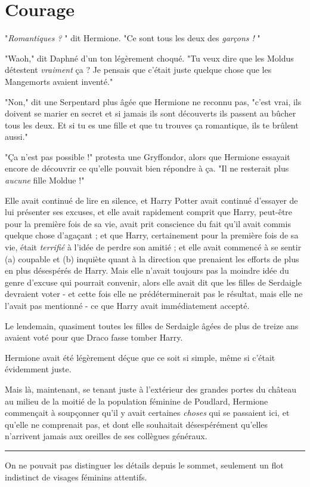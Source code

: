 
\chapter{Courage}

"\emph{Romantiques ?} " dit Hermione. "Ce sont tous les deux des \emph{garçons !} "

"Waoh," dit Daphné d'un ton légèrement choqué. "Tu veux dire que les Moldus détestent \emph{vraiment}  ça ? Je pensais que c'était juste quelque chose que les Mangemorts avaient inventé."

"Non," dit une Serpentard plus âgée que Hermione ne reconnu pas, "c'est vrai, ils doivent se marier en secret et si jamais ils sont découverts ils passent au bûcher tous les deux. Et si tu es une fille et que tu trouves ça romantique, ils te brûlent aussi."

"Ça n'est pas possible !" protesta une Gryffondor, alors que Hermione essayait encore de découvrir ce qu'elle pouvait bien répondre à ça. "Il ne resterait plus \emph{aucune}  fille Moldue !"

Elle avait continué de lire en silence, et Harry Potter avait continué d'essayer de lui présenter ses excuses, et elle avait rapidement comprit que Harry, peut-être pour la première fois de sa vie, avait prit conscience du fait qu'il avait commis quelque chose d'agaçant ; et que Harry, certainement pour la première fois de sa vie, était \emph{terrifié}  à l'idée de perdre son amitié ; et elle avait commencé à se sentir (a) coupable et (b) inquiète quant à la direction que prenaient les efforts de plus en plus désespérés de Harry. Mais elle n'avait toujours pas la moindre idée du genre d'excuse qui pourrait convenir, alors elle avait dit que les filles de Serdaigle devraient voter - et cette fois elle ne prédéterminerait pas le résultat, mais elle ne l'avait pas mentionné - ce que Harry avait immédiatement accepté.

Le lendemain, quasiment toutes les filles de Serdaigle âgées de plus de treize ans avaient voté pour que Draco fasse tomber Harry.

Hermione avait été légèrement déçue que ce soit si simple, même si c'était évidemment juste.

Mais là, maintenant, se tenant juste à l'extérieur des grandes portes du château au milieu de la moitié de la population féminine de Poudlard, Hermione commençait à soupçonner qu'il y avait certaines \emph{choses}  qui se passaient ici, et qu'elle ne comprenait pas, et dont elle souhaitait désespérément qu'elles n'arrivent jamais aux oreilles de ses collègues généraux.
\par\noindent\rule{\textwidth}{0.4pt}
On ne pouvait pas distinguer les détails depuis le sommet, seulement un flot indistinct de visages féminins attentifs.

